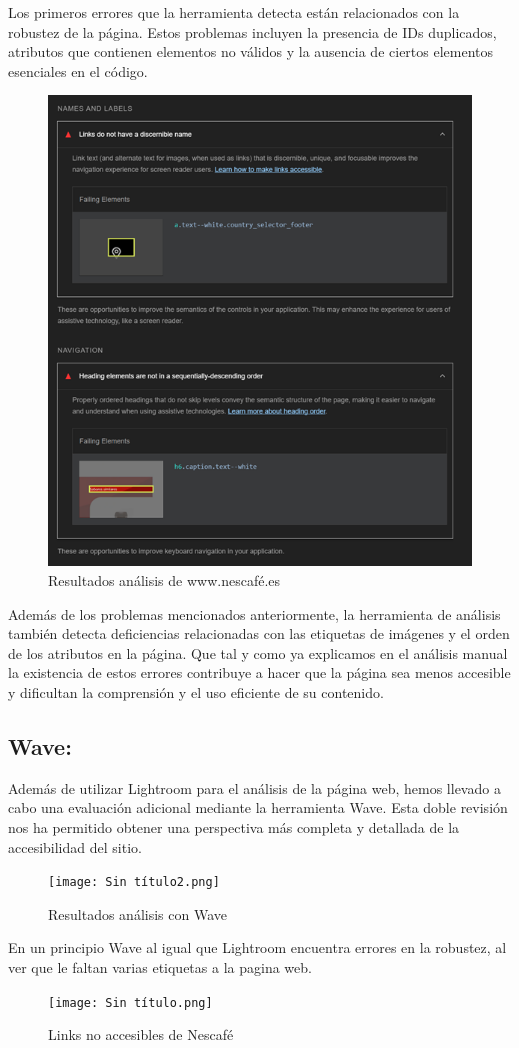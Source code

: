 \documentclass{article}
\begin{document}
Los primeros errores que la herramienta detecta están relacionados con la robustez de la página. Estos problemas incluyen la presencia de IDs duplicados, atributos que contienen elementos no válidos y la ausencia de ciertos elementos esenciales en el código.

\begin{figure}[!h]
        \centering
        \includegraphics[width=0.25\linewidth]{Imagen6.png}
        \caption{Resultados análisis de www.nescafé.es}
\end{figure}

Además de los problemas mencionados anteriormente, la herramienta de análisis también detecta deficiencias relacionadas con las etiquetas de imágenes y el orden de los atributos en la página. Que tal y como ya explicamos en el análisis manual la existencia de estos errores contribuye a hacer que la página sea menos accesible y dificultan la comprensión y el uso eficiente de su contenido.

\newpage
\subsection{Wave:}

Además de utilizar Lightroom para el análisis de la página web, hemos llevado a cabo una evaluación adicional mediante la herramienta Wave. Esta doble revisión nos ha permitido obtener una perspectiva más completa y detallada de la accesibilidad del sitio.

\begin{figure}[!h] 
        \centering
        \texttt{[image: Sin título2.png]}
        \caption{Resultados análisis con Wave}
\end{figure}

En un principio Wave al igual que Lightroom encuentra errores en la robustez, al ver que le faltan varias etiquetas a la pagina web.

\begin{figure}[!h]
        \centering
        \texttt{[image: Sin título.png]}
        \caption{Links no accesibles de Nescafé}
\end{figure}
\end{document}
